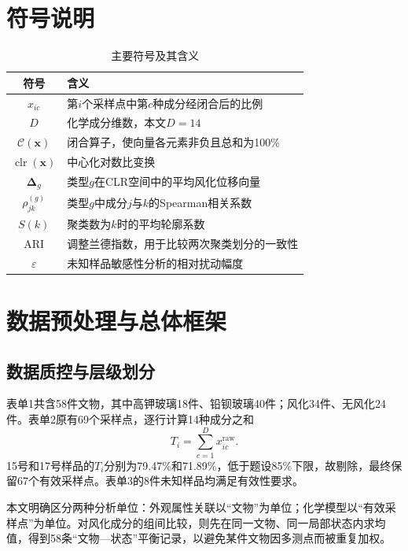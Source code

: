 \documentclass[UTF8,a4paper,zihao=-4,fontset=windows]{ctexart}
\newcommand{\clr}{\operatorname{clr}}
\newcommand{\Clo}{\mathcal{C}}
\begin{document}
\section{符号说明}

\begin{table}[H]
\centering
\caption{主要符号及其含义}
\label{tab:symbols}
\begin{tabularx}{0.91\textwidth}{cX}
\toprule
符号 & 含义 \\
\midrule
$x_{ic}$ & 第$i$个采样点中第$c$种成分经闭合后的比例 \\
$D$ & 化学成分维数，本文$D=14$ \\
$\Clo(\bm{x})$ & 闭合算子，使向量各元素非负且总和为100\% \\
$\clr(\bm{x})$ & 中心化对数比变换 \\
$\bm{\Delta}_g$ & 类型$g$在CLR空间中的平均风化位移向量 \\
$\rho_{jk}^{(g)}$ & 类型$g$中成分$j$与$k$的Spearman相关系数 \\
$S(k)$ & 聚类数为$k$时的平均轮廓系数 \\
$\operatorname{ARI}$ & 调整兰德指数，用于比较两次聚类划分的一致性 \\
$\varepsilon$ & 未知样品敏感性分析的相对扰动幅度 \\
\bottomrule
\end{tabularx}
\end{table}

\section{数据预处理与总体框架}

\subsection{数据质控与层级划分}

表单1共含58件文物，其中高钾玻璃18件、铅钡玻璃40件；风化34件、无风化24件。表单2原有69个采样点，逐行计算14种成分之和
\begin{equation}
  T_i=\sum_{c=1}^{D}x_{ic}^{\mathrm{raw}}.
\end{equation}
15号和17号样品的$T_i$分别为79.47\%和71.89\%，低于题设85\%下限，故剔除，最终保留67个有效采样点。表单3的8件未知样品均满足有效性要求。

本文明确区分两种分析单位：外观属性关联以“文物”为单位；化学模型以“有效采样点”为单位。对风化成分的组间比较，则先在同一文物、同一局部状态内求均值，得到58条“文物—状态”平衡记录，以避免某件文物因多测点而被重复加权。
\end{document}
